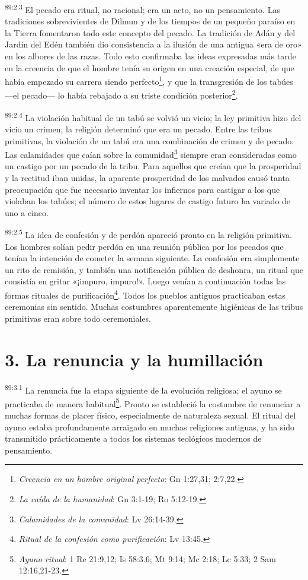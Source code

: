 \par
\textsuperscript{89:2.3} El pecado era ritual, no racional; era un acto, no un pensamiento. Las tradiciones sobrevivientes de Dilmun y de los tiempos de un pequeño paraíso en la Tierra fomentaron todo este concepto del pecado. La tradición de Adán y del Jardín del Edén también dio consistencia a la ilusión de una antigua «era de oro» en los albores de las razas. Todo esto confirmaba las ideas expresadas más tarde en la creencia de que el hombre tenía su origen en una creación especial, de que había empezado su carrera siendo perfecto\footnote{\textit{Creencia en un hombre original perfecto}: Gn 1:27,31; 2:7,22.}, y que la transgresión de los tabúes ---el pecado--- lo había rebajado a su triste condición posterior\footnote{\textit{La caída de la humanidad}: Gn 3:1-19; Ro 5:12-19.}.

\par
\textsuperscript{89:2.4} La violación habitual de un tabú se volvió un vicio; la ley primitiva hizo del vicio un crimen; la religión determinó que era un pecado. Entre las tribus primitivas, la violación de un tabú era una combinación de crimen y de pecado. Las calamidades que caían sobre la comunidad\footnote{\textit{Calamidades de la comunidad}: Lv 26:14-39.} siempre eran consideradas como un castigo por un pecado de la tribu. Para aquellos que creían que la prosperidad y la rectitud iban unidas, la aparente prosperidad de los malvados causó tanta preocupación que fue necesario inventar los infiernos para castigar a los que violaban los tabúes; el número de estos lugares de castigo futuro ha variado de uno a cinco.

\par
\textsuperscript{89:2.5} La idea de confesión y de perdón apareció pronto en la religión primitiva. Los hombres solían pedir perdón en una reunión pública por los pecados que tenían la intención de cometer la semana siguiente. La confesión era simplemente un rito de remisión, y también una notificación pública de deshonra, un ritual que consistía en gritar «¡impuro, impuro!». Luego venían a continuación todas las formas rituales de purificación\footnote{\textit{Ritual de la confesión como purificación}: Lv 13:45.}. Todos los pueblos antiguos practicaban estas ceremonias sin sentido. Muchas costumbres aparentemente higiénicas de las tribus primitivas eran sobre todo ceremoniales.

\section*{3. La renuncia y la humillación}
\par
\textsuperscript{89:3.1} La renuncia fue la etapa siguiente de la evolución religiosa; el ayuno se practicaba de manera habitual\footnote{\textit{Ayuno ritual}: 1 Re 21:9,12; Is 58:3.6; Mt 9:14; Mc 2:18; Lc 5:33; 2 Sam 12:16,21-23.}. Pronto se estableció la costumbre de renunciar a muchas formas de placer físico, especialmente de naturaleza sexual. El ritual del ayuno estaba profundamente arraigado en muchas religiones antiguas, y ha sido transmitido prácticamente a todos los sistemas teológicos modernos de pensamiento.

